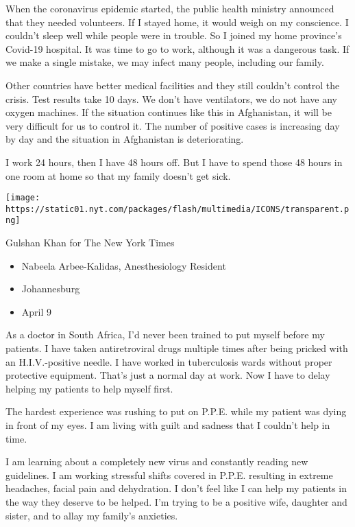 When the coronavirus epidemic started, the public health ministry
announced that they needed volunteers. If I stayed home, it would weigh
on my conscience. I couldn't sleep well while people were in trouble. So
I joined my home province's Covid-19 hospital. It was time to go to
work, although it was a dangerous task. If we make a single mistake, we
may infect many people, including our family.

Other countries have better medical facilities and they still couldn't
control the crisis. Test results take 10 days. We don't have
ventilators, we do not have any oxygen machines. If the situation
continues like this in Afghanistan, it will be very difficult for us to
control it. The number of positive cases is increasing day by day and
the situation in Afghanistan is deteriorating.

I work 24 hours, then I have 48 hours off. But I have to spend those 48
hours in one room at home so that my family doesn't get sick.

\texttt{[image: https://static01.nyt.com/packages/flash/multimedia/ICONS/transparent.png]}

Gulshan Khan for The New York Times

\begin{itemize}
\tightlist
\item
  Nabeela Arbee-Kalidas, Anesthesiology Resident
\item
  Johannesburg
\item
  April 9
\end{itemize}

As a doctor in South Africa, I'd never been trained to put myself before
my patients. I have taken antiretroviral drugs multiple times after
being pricked with an H.I.V.-positive needle. I have worked in
tuberculosis wards without proper protective equipment. That's just a
normal day at work. Now I have to delay helping my patients to help
myself first.

The hardest experience was rushing to put on P.P.E. while my patient was
dying in front of my eyes. I am living with guilt and sadness that I
couldn't help in time.

I am learning about a completely new virus and constantly reading new
guidelines. I am working stressful shifts covered in P.P.E. resulting in
extreme headaches, facial pain and dehydration. I don't feel like I can
help my patients in the way they deserve to be helped. I'm trying to be
a positive wife, daughter and sister, and to allay my family's
anxieties.

